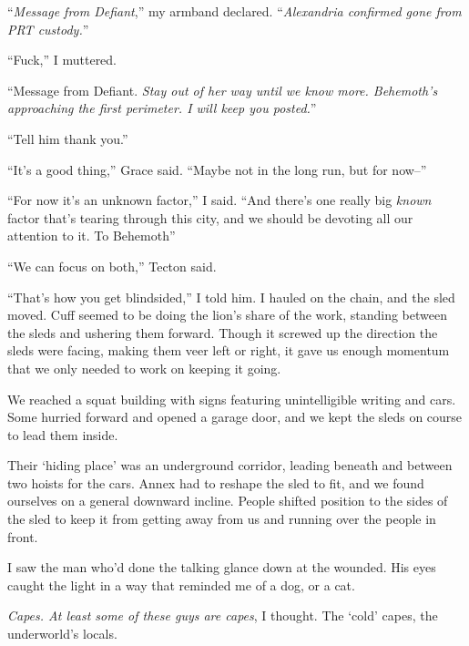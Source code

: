 ``\emph{Message from Defiant},'' my armband declared.  ``\emph{Alexandria confirmed gone from PRT custody.}''



``Fuck,'' I muttered.



``Message from Defiant.  \emph{Stay out of her way until we know more.  Behemoth's approaching the first perimeter.  I will keep you posted.}''



``Tell him thank you.''



``It's a good thing,'' Grace said.  ``Maybe not in the long run, but for now--''



``For now it's an unknown factor,'' I said.  ``And there's one really big \emph{known} factor that's tearing through this city, and we should be devoting all our attention to it.  To Behemoth''



``We can focus on both,'' Tecton said.



``That's how you get blindsided,'' I told him.  I hauled on the chain, and the sled moved.  Cuff seemed to be doing the lion's share of the work, standing between the sleds and ushering them forward.  Though it screwed up the direction the sleds were facing, making them veer left or right, it gave us enough momentum that we only needed to work on keeping it going.



We reached a squat building with signs featuring unintelligible writing and cars.  Some hurried forward and opened a garage door, and we kept the sleds on course to lead them inside.



Their `hiding place' was an underground corridor, leading beneath and between two hoists for the cars.  Annex had to reshape the sled to fit, and we found ourselves on a general downward incline.  People shifted position to the sides of the sled to keep it from getting away from us and running over the people in front.



I saw the man who'd done the talking glance down at the wounded.  His eyes caught the light in a way that reminded me of a dog, or a cat.



\emph{Capes.  At least some of these guys are capes}, I thought.  The `cold' capes, the underworld's locals.



